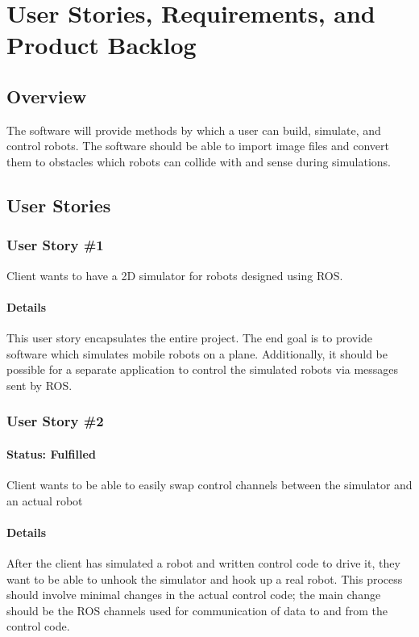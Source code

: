 
\chapter{User Stories,  Requirements, and Product Backlog}
\section{Overview}
The software will provide methods by which a user can build, simulate, and control robots. The software should be able to import image files and convert them to obstacles which robots can collide with and sense during simulations.

\section{User Stories}
\subsection{User Story \#1\label{us:1}}
Client wants to have a 2D simulator for robots designed using ROS.

\subsubsection*{Details}
This user story encapsulates the entire project. The end goal is to provide software which simulates mobile robots on a plane. Additionally, it should be possible for a separate application to control the simulated robots via messages sent by ROS.

\subsection{User Story \#2\label{us:2}} 
\subsubsection*{Status: Fulfilled}
Client wants to be able to easily swap control channels between the simulator and an actual robot

\subsubsection*{Details}
After the client has simulated a robot and written control code to drive it, they want to be able to unhook the simulator and hook up a real robot. This process should involve minimal changes in the actual control code; the main change should be the ROS channels used for communication of data to and from the control code.

